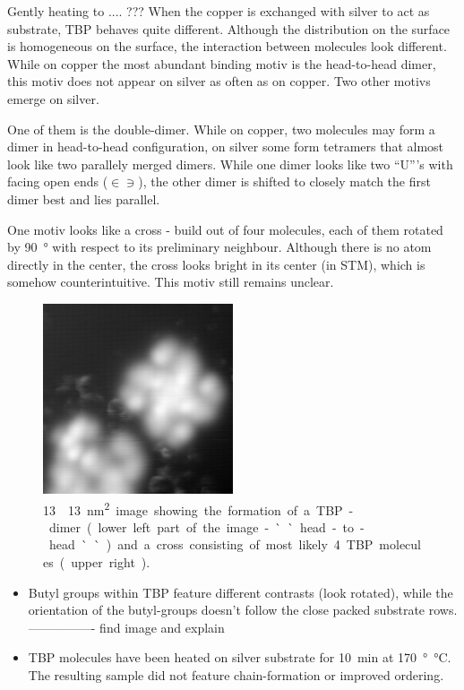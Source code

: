 Gently heating to  .... ???
When the copper is exchanged with silver to act as substrate, TBP behaves quite different. Although the distribution on the surface is homogeneous on the surface, the interaction between molecules look different. While on copper the most abundant binding motiv is the head-to-head dimer, this motiv does not appear on silver as often as on copper. Two other motivs emerge on silver.

One of them is the double-dimer.  While on copper, two molecules may form a dimer in head-to-head configuration, on silver some form tetramers that almost look like two parallely merged dimers. While one dimer looks like two ``U'''s with facing open ends ($\in \ni$), the other dimer is shifted to closely match the first dimer best and lies parallel.


One motiv looks like a cross - build out of four molecules, each of them rotated by \SI{90}{\degree} with respect to its preliminary neighbour. Although there is no atom directly in the center, the cross looks bright in its center (in STM), which is somehow counterintuitive. This motiv still remains unclear.

\begin{figure}[h]
 \begin{center}
  \includegraphics[width=0.5\textwidth]{./images/F150612-154558.jpg}
 \end{center}
\caption{\SI{13}\times\SI{13}{\nm \squared} image showing the formation of a TBP-dimer (lower left part of the image - ``head-to-head``) and a cross consisting of most likely 4 TBP molecules (upper right).}
\end{figure}

\begin{itemize}
 \item Butyl groups within TBP feature different contrasts (look rotated), while the orientation of the butyl-groups doesn't follow the close packed substrate rows. ---------------- find image and explain
 \item TBP molecules have been heated on silver substrate for \SI{10}{\minute} at \SI{170}{\degree \celsius}. The resulting sample did not feature chain-formation or improved ordering.
\end{itemize}

